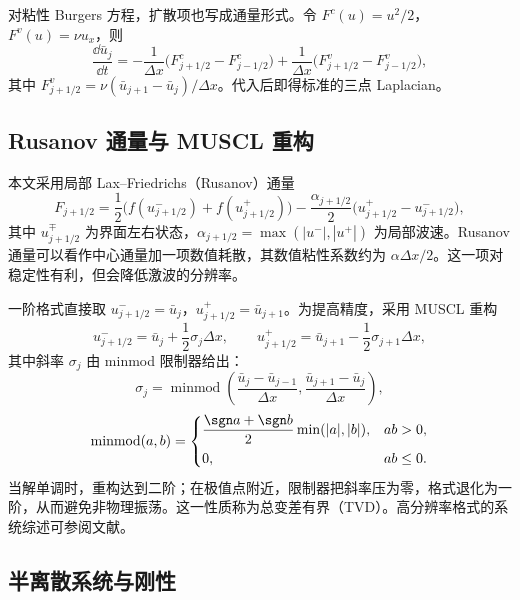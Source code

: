对粘性 Burgers 方程，扩散项也写成通量形式。令 $F^{c}(u)=u^2/2$，$F^{v}(u)=\nu u_x$，则
\begin{equation}
  \frac{\dd \bar u_j}{\dd t}
  =-\frac{1}{\Delta x}\bigl(F^{c}_{j+1/2}-F^{c}_{j-1/2}\bigr)
  +\frac{1}{\Delta x}\bigl(F^{v}_{j+1/2}-F^{v}_{j-1/2}\bigr),
  \label{eq:fv-burgers}
\end{equation}
其中 $F^{v}_{j+1/2}=\nu(\bar u_{j+1}-\bar u_j)/\Delta x$。代入后即得标准的三点 Laplacian。

\subsection{Rusanov 通量与 MUSCL 重构}

本文采用局部 Lax--Friedrichs（Rusanov）通量
\begin{equation}
  F_{j+1/2}=\frac12\bigl(f(u^-_{j+1/2})+f(u^+_{j+1/2})\bigr)
  -\frac{\alpha_{j+1/2}}{2}\bigl(u^+_{j+1/2}-u^-_{j+1/2}\bigr),
  \label{eq:rusanov}
\end{equation}
其中 $u^\mp_{j+1/2}$ 为界面左右状态，$\alpha_{j+1/2}=\max(|u^-|,|u^+|)$ 为局部波速。Rusanov 通量可以看作中心通量加一项数值耗散，其数值粘性系数约为 $\alpha\Delta x/2$。这一项对稳定性有利，但会降低激波的分辨率。

一阶格式直接取 $u^-_{j+1/2}=\bar u_j$，$u^+_{j+1/2}=\bar u_{j+1}$。为提高精度，采用 MUSCL 重构
\begin{equation}
  u^-_{j+1/2}=\bar u_j+\frac12\sigma_j\Delta x,\qquad
  u^+_{j+1/2}=\bar u_{j+1}-\frac12\sigma_{j+1}\Delta x,
  \label{eq:muscl}
\end{equation}
其中斜率 $\sigma_j$ 由 minmod 限制器给出：
\begin{equation}
  \sigma_j=\operatorname{minmod}\left(
  \frac{\bar u_j-\bar u_{j-1}}{\Delta x},
  \frac{\bar u_{j+1}-\bar u_j}{\Delta x}\right),
  \label{eq:minmod}
\end{equation}
\begin{equation}
  \operatorname{minmod}(a,b)=
  \begin{cases}
    \dfrac{\sgn a+\sgn b}{2}\min(|a|,|b|), & ab>0,\\[6pt]
    0, & ab\le0.
  \end{cases}
  \label{eq:minmod-def}
\end{equation}
当解单调时，重构达到二阶；在极值点附近，限制器把斜率压为零，格式退化为一阶，从而避免非物理振荡。这一性质称为总变差有界（TVD）。高分辨率格式的系统综述可参阅文献\cite{shu1998}。

\subsection{半离散系统与刚性}

